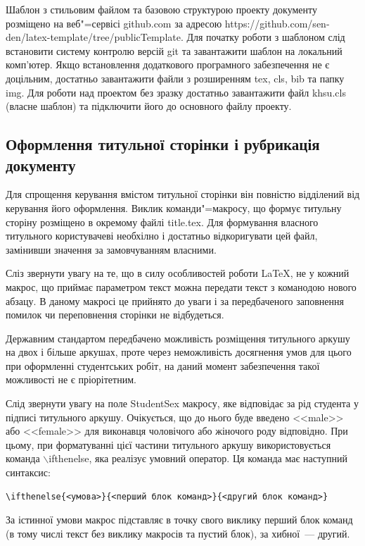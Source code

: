 Шаблон з стильовим файлом та базовою структурою проекту документу розміщено на веб"=сервісі github.com за адресою https://github.com/sen-den/latex-template/tree/publicTemplate. Для початку роботи з шаблоном слід встановити систему контролю версій git та завантажити шаблон на локальний комп'ютер. Якщо встановлення додаткового програмного забезпечення не є доцільним, достатньо завантажити файли з розширенням tex, cls, bib та папку img. Для роботи над проектом без зразку достатньо завантажити файл khsu.cls (власне шаблон) та підключити його до основного файлу проекту.

\subsection{Оформлення титульної сторінки і рубрикація документу}

Для спрощення керування вмістом титульної сторінки він повністю відділений від керування його оформлення. Виклик команди"=макросу, що формує титульну сторіну розміщено в окремому файлі title.tex. Для формування власного титульного користувачеві необхілно і достатньо відкоригувати цей файл, замінивши значення за замовчуванням власними.

Сліз звернути увагу на те, що в силу особливостей роботи \LaTeX{}, не у кожний макрос, що приймає параметром текст можна передати текст з команодою нового абзацу. В даному макросі це прийнято до уваги і за передбаченого заповнення помилок чи переповнення сторінки не відбудеться.

Державним стандартом передбачено \cite[с.~15]{DSTU20153008} можливість розміщення титульного аркушу на двох і більше аркушах, проте через неможливість досягнення умов для цього при оформленні студентських робіт, на даний момент забезпечення такої можливості не є пріорітетним.

Слід звернути увагу на поле StudentSex макросу, яке відповідає за рід студента у підписі титульного аркушу. Очікується, що до нього буде введено <<male>> або <<female>> для виконавця чоловічого або жіночого роду відповідно. При цьому, при форматуванні цієї частини титульного аркушу використовується команда $\backslash$ifthenelse, яка реалізує умовний оператор. Ця команда має наступний синтаксис:
\begin{verbatim}
\ifthenelse{<умова>}{<перший блок команд>}{<другий блок команд>}
\end{verbatim}

За істинної умови макрос підставляє в точку свого виклику перший блок команд (в тому числі текст без виклику макросів та пустий блок), за хибної~--- другий.

